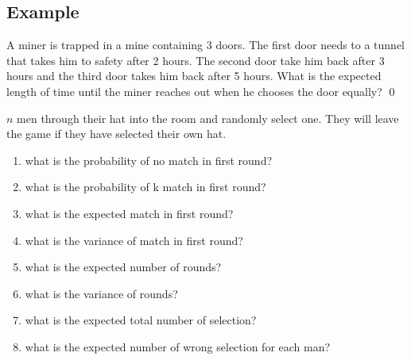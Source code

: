 \subsection{Example}

\begin{example}
    A miner is trapped in a mine containing 3 doors. The first door needs to a tunnel that takes him to safety after 2 hours. The second door take him back after 3 hours and the third door takes him back after 5 hours. What is the expected length of time until the miner reaches out when he chooses the door equally?    
    \qed
\end{example}

\begin{example}
    $n$ men through their hat into the room and randomly select one. They will leave the game if they have selected their own hat.
    \begin{enumerate}
        \item \label{hatq1} what is the probability of no match in first round?
        \item \label{hatq2} what is the probability of k match in first round?
        \item \label{hatq3} what is the expected match in first round?
        \item \label{hatq4} what is the variance of match in first round?
        \item \label{hatq5} what is the expected number of rounds?
        \item \label{hatq6} what is the variance of rounds?
        \item \label{hatq7} what is the expected total number of selection?
        \item \label{hatq8} what is the expected number of wrong selection for each man?
    \end{enumerate}    
\end{example}
